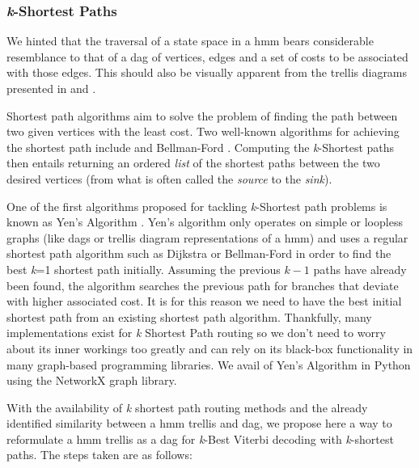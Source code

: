 {{{{{{{{\subsubsection{\textit{k}-Shortest Paths}

We hinted that the traversal of a state space in a \acrshort{hmm} bears considerable resemblance to that of a \acrfull{dag} of vertices, edges and a set of costs to be associated with those edges. This should also be visually apparent from the trellis diagrams presented in  and .

Shortest path algorithms aim to solve the problem of finding the path between two given vertices with the least cost. Two well-known algorithms for achieving the shortest path include \cite{dijkstra1959note} and Bellman-Ford \citep{bellman1958routing, ford1956network}. Computing the \textit{k}-Shortest paths then entails returning an ordered \textit{list} of the shortest paths between the two desired vertices (from what is often called the \textit{source} to the \textit{sink}).

One of the first algorithms proposed for tackling \textit{k}-Shortest path problems is known as Yen's Algorithm \citep{Yen1971}. Yen's algorithm only operates on simple or loopless graphs (like \acrshort{dag}s or trellis diagram representations of a \acrshort{hmm}) and uses a regular shortest path algorithm such as Dijkstra or Bellman-Ford in order to find the best \textit{k}=1 shortest path initially. Assuming the previous $k-1$ paths have already been found, the algorithm searches the previous path for branches that deviate with higher associated cost. It is for this reason we need to have the best initial shortest path from an existing shortest path algorithm. Thankfully, many implementations exist for \textit{k} Shortest Path routing so we don't need to worry about its inner workings too greatly and can rely on its black-box functionality in many graph-based programming libraries. We avail of Yen's Algorithm in Python using the NetworkX \cite{Hagberg2008} graph library. 

With the availability of \textit{k} shortest path routing methods and the already identified similarity between a \acrshort{hmm} trellis and \acrshort{dag}, we propose here a way to reformulate a \acrshort{hmm} trellis as a \acrshort{dag} for \textit{k}-Best Viterbi decoding with \textit{k}-shortest paths. The steps taken are as follows:

}}}}}}}}
